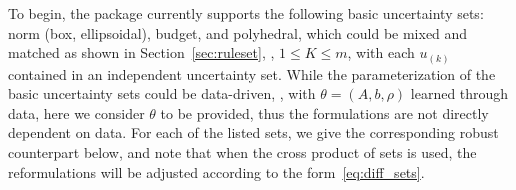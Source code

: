 To begin, the package currently supports the following basic uncertainty sets: norm (box, ellipsoidal), budget, and polyhedral, which could be mixed and matched as shown in Section~\ref{sec:ruleset}, \ie, $1\leq K \leq m$, with each $u_{(k)}$ contained in an independent uncertainty set.  While the parameterization of the basic uncertainty sets could be data-driven, \ie, with $\theta = (A,b,\rho)$ learned through data, here we consider $\theta$ to be provided, thus the formulations are not directly dependent on data. 
For each of the listed sets, we give the corresponding robust counterpart below, and note that when the cross product of sets is used, the reformulations will be adjusted according to the form~\eqref{eq:diff_sets}.

